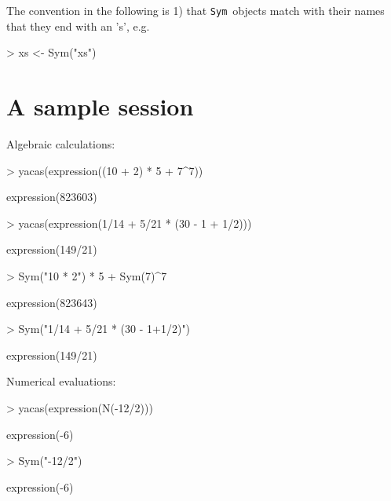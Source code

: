 \documentclass[]{article}
\def\sym{\texttt{Sym}}
\begin{document}
The convention in the following is 1) that \sym\ objects match with
their names that they end with an 's', e.g.
\begin{Schunk}
\begin{Sinput}
> xs <- Sym("xs")
\end{Sinput}
\end{Schunk}


\section{A sample session} 
\label{sec:samplesession}

Algebraic calculations:
\begin{Schunk}
\begin{Sinput}
> yacas(expression((10 + 2) * 5 + 7^7))
\end{Sinput}
\begin{Soutput}
expression(823603)
\end{Soutput}
\begin{Sinput}
> yacas(expression(1/14 + 5/21 * (30 - 1 + 1/2)))
\end{Sinput}
\begin{Soutput}
expression(149/21)
\end{Soutput}
\end{Schunk}

\begin{Schunk}
\begin{Sinput}
> Sym("10 * 2") * 5 + Sym(7)^7
\end{Sinput}
\begin{Soutput}
expression(823643)
\end{Soutput}
\begin{Sinput}
> Sym("1/14 + 5/21 * (30 - 1+1/2)")
\end{Sinput}
\begin{Soutput}
expression(149/21)
\end{Soutput}
\end{Schunk}


Numerical evaluations:
\begin{Schunk}
\begin{Sinput}
> yacas(expression(N(-12/2)))
\end{Sinput}
\begin{Soutput}
expression(-6)
\end{Soutput}
\end{Schunk}
\begin{Schunk}
\begin{Sinput}
> Sym("-12/2")
\end{Sinput}
\begin{Soutput}
expression(-6)
\end{Soutput}
\end{Schunk}
\end{document}
